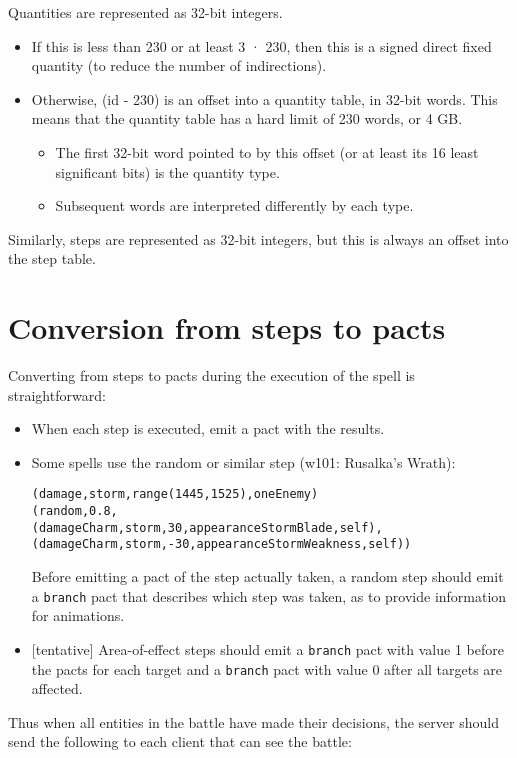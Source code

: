 \documentclass{article}
\begin{document}
Quantities are represented as 32-bit integers.

\begin{itemize}
  \item If this is less than 230 or at least 3 · 230, then this is a signed direct fixed quantity (to reduce the number of indirections).
  \item Otherwise, (id - 230) is an offset into a quantity table, in 32-bit words. This means that the quantity table has a hard limit of 230 words, or 4 GB.
  \begin{itemize}
    \item The first 32-bit word pointed to by this offset (or at least its 16 least significant bits) is the quantity type.
    \item Subsequent words are interpreted differently by each type.
  \end{itemize}
\end{itemize}

Similarly, steps are represented as 32-bit integers, but this is always an offset into the step table.

\section{Conversion from steps to pacts}

Converting from steps to pacts during the execution of the spell is straightforward:

\begin{itemize}
  \item When each step is executed, emit a pact with the results.
  \item Some spells use the random or similar step (w101: Rusalka's Wrath):
\begin{alltt}
(damage, storm, range(1445, 1525), oneEnemy)
(random, 0.8,
  (damageCharm, storm, 30, appearanceStormBlade, self),
  (damageCharm, storm, -30, appearanceStormWeakness, self))
\end{alltt}
  Before emitting a pact of the step actually taken, a random step should emit a \texttt{branch} pact that describes which step was taken, as to provide information for animations.
  \item {[tentative]} Area-of-effect steps should emit a \texttt{branch} pact with value 1 before the pacts for each target and a \texttt{branch} pact with value 0 after all targets are affected.
\end{itemize}

Thus when all entities in the battle have made their decisions, the server should send the following to each client that can see the battle:
\end{document}
